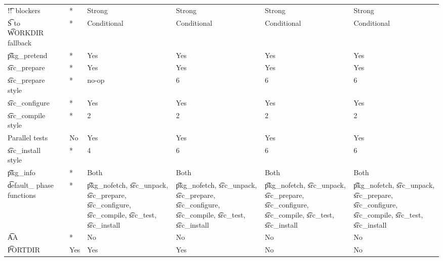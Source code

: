 \begin{landscape}
\begin{longtable}{llP{7.5em}P{7.5em}P{7.5em}P{7.5em}P{7.5em}}
\t{!!}\ blockers &  &
    * & Strong & Strong & Strong & Strong \\

\t{S} to \t{WORKDIR} fallback &  &
    * & Conditional & Conditional & Conditional & Conditional \\

\t{pkg_pretend} &  &
    * & Yes & Yes & Yes & Yes \\

\t{src_prepare} &  &
    * & Yes & Yes & Yes & Yes \\

\t{src_prepare} style &  &
    * & no-op & 6 & 6 & 6 \\

\t{src_configure} &  &
    * & Yes & Yes & Yes & Yes \\

\t{src_compile} style &  &
    * & 2 & 2 & 2 & 2 \\

Parallel tests &  &
    No & Yes & Yes & Yes & Yes \\

\t{src_install} style &  &
    * & 4 & 6 & 6 & 6 \\

\t{pkg_info} &  &
    * & Both & Both & Both & Both \\

\t{default_} phase functions &  &
    * &
    \t{pkg_nofetch}, \t{src_unpack}, \t{src_prepare}, \t{src_configure},
        \t{src_compile}, \t{src_test}, \t{src_install} &
    \t{pkg_nofetch}, \t{src_unpack}, \t{src_prepare}, \t{src_configure},
        \t{src_compile}, \t{src_test}, \t{src_install} &
    \t{pkg_nofetch}, \t{src_unpack}, \t{src_prepare}, \t{src_configure},
        \t{src_compile}, \t{src_test}, \t{src_install} &
    \t{pkg_nofetch}, \t{src_unpack}, \t{src_prepare}, \t{src_configure},
        \t{src_compile}, \t{src_test}, \t{src_install} \\

\t{AA} &  &
    * & No & No & No & No \\

\t{PORTDIR} &  &
    Yes & Yes & Yes & No & No \\


\end{longtable}
\end{landscape}
